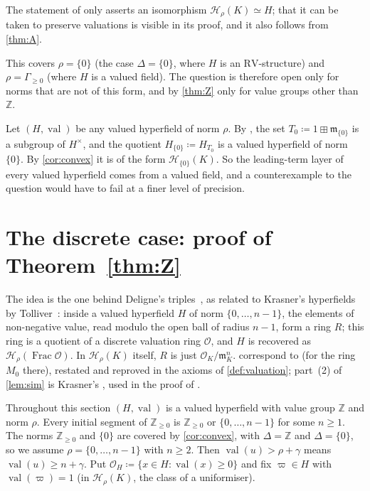 \documentclass[11pt]{amsart}
\numberwithin{equation}{section}
\newcommand{\hplus}{\boxplus}
\newcommand{\val}{\operatorname{val}}
\newcommand{\m}{\mathfrak m}
\newcommand{\Hr}{\mathcal H_\rho}
\newcommand{\Z}{\mathbb Z}
\begin{document}
The statement of \cite[Theorem~4.1]{LT25} only asserts an isomorphism $\Hr(K)\simeq H$; that it can be taken to preserve valuations is visible in its proof, and it also follows from \cref{thm:A}.

This covers $\rho=\{0\}$ (the case $\Delta=\{0\}$, where $H$ is an $\mathrm{RV}$-structure) and $\rho=\Gamma_{\ge0}$ (where $H$ is a valued field). The question is therefore open only for norms that are not of this form, and by \cref{thm:Z} only for value groups other than $\Z$.

\begin{remark}\label{rem:leading-layer}
Let $(H,\val)$ be any valued hyperfield of norm $\rho$. By \cite[Proposition~1.17]{LT25}, the set $T_0\coloneqq 1\hplus\m_{\{0\}}$ is a subgroup of $H^\times$, and the quotient $H_{\{0\}}\coloneqq H_{T_0}$ is a valued hyperfield of norm $\{0\}$. By \cref{cor:convex} it is of the form $\mathcal H_{\{0\}}(K)$. So the leading-term layer of every valued hyperfield comes from a valued field, and a counterexample to the question would have to fail at a finer level of precision.
\end{remark}

\section{The discrete case: proof of Theorem~\ref{thm:Z}}\label{sec:C}

The idea is the one behind Deligne's triples~\cite{Deligne84}, as related to Krasner's hyperfields by Tolliver~\cite{Tolliver16}: inside a valued hyperfield $H$ of norm $\{0,\dots,n-1\}$, the elements of non-negative value, read modulo the open ball of radius $n-1$, form a ring $R$; this ring is a quotient of a discrete valuation ring $\mathcal O$, and $H$ is recovered as $\Hr(\operatorname{Frac}\mathcal O)$. In $\Hr(K)$ itself, $R$ is just $\mathcal O_K/\m_K^n$.  correspond to \cite[Lemmas~4.2 and~4.3]{Tolliver16} (for the ring $M_0$ there), restated and reproved in the axioms of \cref{def:valuation}; part~(2) of \cref{lem:sim} is Krasner's \cite[p.~145]{Krasner57}, used in the proof of \cite[Proposition~6.1]{Tolliver16}.

Throughout this section $(H,\val)$ is a valued hyperfield with value group $\Z$ and norm $\rho$. Every initial segment of $\Z_{\ge0}$ is $\Z_{\ge0}$ or $\{0,\dots,n-1\}$ for some $n\ge1$. The norms $\Z_{\ge0}$ and $\{0\}$ are covered by \cref{cor:convex}, with $\Delta=\Z$ and $\Delta=\{0\}$, so we assume $\rho=\{0,\dots,n-1\}$ with $n\ge2$. Then $\val(u)>\rho+\gamma$ means $\val(u)\ge n+\gamma$. Put $\mathcal O_H\coloneqq\{x\in H:\val(x)\ge0\}$ and fix $\varpi\in H$ with $\val(\varpi)=1$ (in $\Hr(K)$, the class of a uniformiser).
\end{document}
